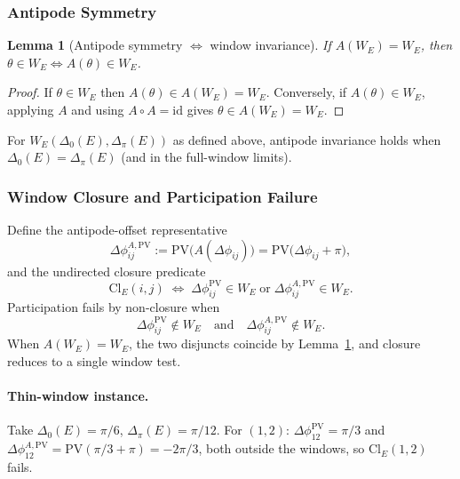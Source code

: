 \documentclass[aps,prx,onecolumn,11pt]{revtex4-2}
\theoremstyle{plain}
\newtheorem{lemma}{Lemma}
\theoremstyle{definition}
\theoremstyle{remark}
\begin{document}
\subsubsection{Antipode Symmetry}
\label{subsubsec:toy_phasecircle_antipode_lemma}

\begin{lemma}[Antipode symmetry $\Longleftrightarrow$ window
invariance]
\label{lem:toy_phasecircle_antipode_invariance}
If $A(W_E) = W_E$, then
$\theta \in W_E \Longleftrightarrow A(\theta) \in W_E$.
\end{lemma}

\begin{proof}
If $\theta \in W_E$ then $A(\theta) \in A(W_E) = W_E$. Conversely,
if $A(\theta) \in W_E$, applying $A$ and using $A \circ A =
\mathrm{id}$ gives $\theta \in A(W_E) = W_E$.
\qedhere
\end{proof}

For $W_E(\Delta_0(E), \Delta_\pi(E))$ as defined above, antipode
invariance holds when $\Delta_0(E) = \Delta_\pi(E)$ (and in the
full-window limits).

\subsubsection{Window Closure and Participation Failure}
\label{subsubsec:toy_phasecircle_nonclosure}

Define the antipode-offset representative
\begin{equation}
\Delta\phi_{ij}^{A,\mathrm{PV}} :=
\mathrm{PV}\!\bigl(A(\Delta\phi_{ij})\bigr) =
\mathrm{PV}\!\bigl(\Delta\phi_{ij} + \pi\bigr),
\label{eq:toy_phasecircle_antipode_offset}
\end{equation}
and the undirected closure predicate
\begin{equation}
\mathrm{Cl}_E(i,j)
\;\Longleftrightarrow\;
\Delta\phi_{ij}^{\mathrm{PV}} \in W_E
\;\text{or}\;
\Delta\phi_{ij}^{A,\mathrm{PV}} \in W_E.
\label{eq:toy_phasecircle_closure_condition}
\end{equation}
Participation fails by non-closure when
\begin{equation}
\Delta\phi_{ij}^{\mathrm{PV}} \notin W_E
\quad\text{and}\quad
\Delta\phi_{ij}^{A,\mathrm{PV}} \notin W_E.
\label{eq:toy_phasecircle_nonclosure_condition}
\end{equation}
When \(A(W_E)=W_E\), the two disjuncts coincide by
Lemma~\ref{lem:toy_phasecircle_antipode_invariance}, and closure
reduces to a single window test.

\paragraph{Thin-window instance.}
Take $\Delta_0(E) = \pi/6$, $\Delta_\pi(E) = \pi/12$. For $(1,2)$:
$\Delta\phi_{12}^{\mathrm{PV}} = \pi/3$ and
$\Delta\phi_{12}^{A,\mathrm{PV}} =
\mathrm{PV}(\pi/3 + \pi) = -2\pi/3$, both outside the windows, so
$\mathrm{Cl}_E(1,2)$ fails.
\end{document}
